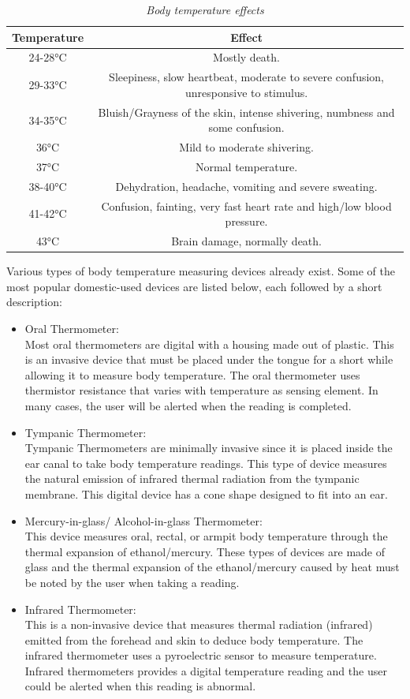 \begin{table}[H]
	\centering
	\caption{\textit{Body temperature effects}\cite{Chen2019}}
	\label{tab:1}
	\begin{tabular}{|c|c|}
		\hline
		\textbf{Temperature} & \textbf{Effect}\\
		\hline
		\hline
		24-28°C & Mostly death.\\
		\hline
		29-33°C & Sleepiness, slow heartbeat, moderate to severe confusion, unresponsive to stimulus.\\
		\hline
		34-35°C & Bluish/Grayness of the skin, intense shivering, numbness and some confusion.\\
		\hline
		36°C & Mild to moderate shivering.\\
		\hline
		37°C & Normal temperature.\\
		\hline
		38-40°C & Dehydration, headache, vomiting and severe sweating.\\
		\hline
		41-42°C & Confusion, fainting, very fast heart rate and high/low blood pressure.\\
		\hline
		43°C & Brain damage, normally death.\\
		\hline
	\end{tabular}
\end{table}
\noindent
Various types of body temperature measuring devices already exist. Some of the most popular domestic-used devices are listed below, each followed by a short description:
\begin{itemize}
	\item Oral Thermometer:\\Most oral thermometers are digital with a housing made out of plastic. This is an invasive device that must be placed under the tongue for a short while allowing it to measure body temperature. The oral thermometer uses thermistor resistance that varies with temperature as sensing element. In many cases, the user will be alerted when the reading is completed. 
	\item Tympanic Thermometer:\\Tympanic Thermometers are minimally invasive since it is placed inside the ear canal to take body temperature readings. This type of device measures the natural emission of infrared thermal radiation from the	tympanic membrane. This digital device has a cone shape designed to fit into an ear. 
	\item Mercury-in-glass/ Alcohol-in-glass Thermometer:\\ This device measures oral, rectal, or armpit body temperature through the thermal expansion of ethanol/mercury. These types of devices are made of glass and the thermal expansion of the ethanol/mercury caused by heat must be noted by the user when taking a reading. 
	\item Infrared Thermometer:\\This is a non-invasive device that measures thermal radiation (infrared) emitted from the forehead and skin to deduce body temperature. The infrared thermometer uses a pyroelectric sensor to measure temperature. Infrared thermometers provides a digital temperature reading and the user could be alerted when this reading is abnormal. 
\end{itemize}

